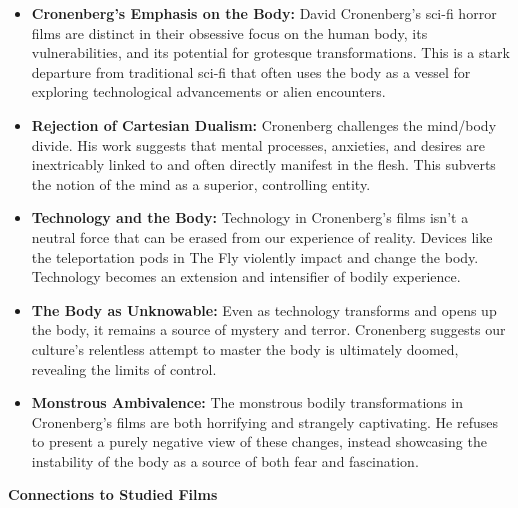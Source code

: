 \documentclass[11pt,fleqn]{book}
\begin{document}
\begin{itemize}
\item \textbf{Cronenberg's Emphasis on the Body:} David Cronenberg's sci-fi horror films are distinct in their obsessive focus on the human body, its vulnerabilities, and its potential for grotesque transformations. This is a stark departure from traditional sci-fi that often uses the body as a vessel for exploring technological advancements or alien encounters.

\item \textbf{Rejection of Cartesian Dualism:} Cronenberg challenges the mind/body divide. His work suggests that mental processes, anxieties, and desires are inextricably linked to and often directly manifest in the flesh. This subverts the notion of the mind as a superior, controlling entity. 

\item \textbf{Technology and the Body:} Technology in Cronenberg's films isn't a neutral force that can be erased from our experience of reality. Devices like the teleportation pods in The Fly violently impact and change the body. Technology becomes an extension and intensifier of bodily experience. 

\item \textbf{The Body as Unknowable:} Even as technology transforms and opens up the body, it remains a source of mystery and terror. Cronenberg suggests our culture's relentless attempt to master the body is ultimately doomed, revealing the limits of control. 

\item \textbf{Monstrous Ambivalence:} The monstrous bodily transformations in Cronenberg's films are both horrifying and strangely captivating. He refuses to present a purely negative view of these changes, instead showcasing the instability of the body as a source of both fear and fascination.
\end{itemize}
\vspace{5pt}
\textbf{Connections to Studied Films}
\end{document}
